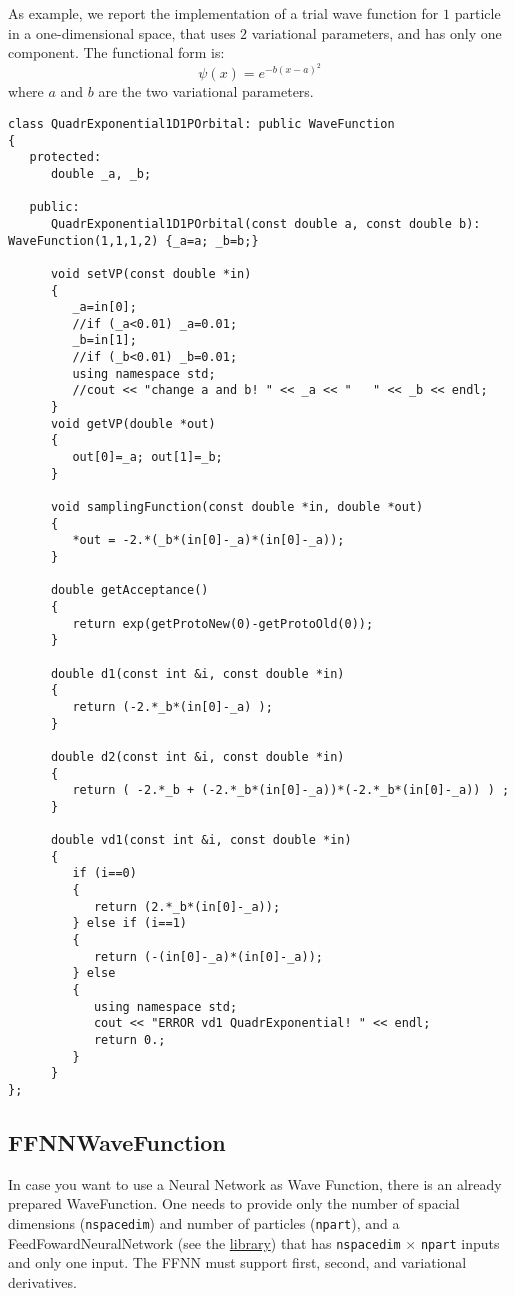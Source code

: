 \documentclass[11pt,a4paper,twoside]{article}
\begin{document}
As example, we report the implementation of a trial wave function for $1$ particle in a one-dimensional space, that uses $2$ variational parameters, and has only one component.
The functional form is:
\begin{equation}
  \psi(x) = e^{- b(x-a)^2}
\end{equation}
where $a$ and $b$ are the two variational parameters.

\begin{lstlisting}
class QuadrExponential1D1POrbital: public WaveFunction
{
   protected:
      double _a, _b;

   public:
      QuadrExponential1D1POrbital(const double a, const double b): WaveFunction(1,1,1,2) {_a=a; _b=b;}

      void setVP(const double *in)
      {
         _a=in[0];
         //if (_a<0.01) _a=0.01;
         _b=in[1];
         //if (_b<0.01) _b=0.01;
         using namespace std;
         //cout << "change a and b! " << _a << "   " << _b << endl;
      }
      void getVP(double *out)
      {
         out[0]=_a; out[1]=_b;
      }

      void samplingFunction(const double *in, double *out)
      {
         *out = -2.*(_b*(in[0]-_a)*(in[0]-_a));
      }

      double getAcceptance()
      {
         return exp(getProtoNew(0)-getProtoOld(0));
      }

      double d1(const int &i, const double *in)
      {
         return (-2.*_b*(in[0]-_a) );
      }

      double d2(const int &i, const double *in)
      {
         return ( -2.*_b + (-2.*_b*(in[0]-_a))*(-2.*_b*(in[0]-_a)) ) ;
      }

      double vd1(const int &i, const double *in)
      {
         if (i==0)
         {
            return (2.*_b*(in[0]-_a));
         } else if (i==1)
         {
            return (-(in[0]-_a)*(in[0]-_a));
         } else
         {
            using namespace std;
            cout << "ERROR vd1 QuadrExponential! " << endl;
            return 0.;
         }
      }
};
\end{lstlisting}




\subsection{FFNNWaveFunction} %
\label{sub:ffnnwavefunction}

In case you want to use a Neural Network as Wave Function, there is an already prepared WaveFunction.
One needs to provide only the number of spacial dimensions (\verb+nspacedim+) and number of particles (\verb+npart+), and a FeedFowardNeuralNetwork (see the \href{https://github.com/francesco086/FeedForwardNeuralNetwork}{library}) that has \verb+nspacedim+ $\times$ \verb+npart+ inputs and only one input.
The FFNN must support first, second, and variational derivatives.
\end{document}
